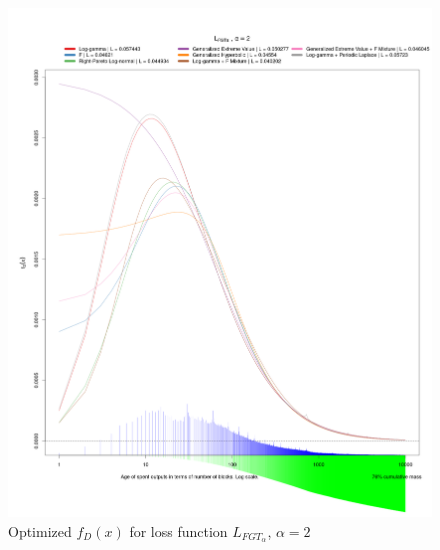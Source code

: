 \documentclass[english]{article}
\begin{document}
\begin{figure}
\caption{Optimized $f_{D}(x)$ for loss function $L_{FGT_{\alpha}}$, $\alpha=2$}

\includegraphics[scale=0.35]{images/dry-run/estimate/estimate-L_FGT-flavor-2}
\end{figure}
\end{document}
